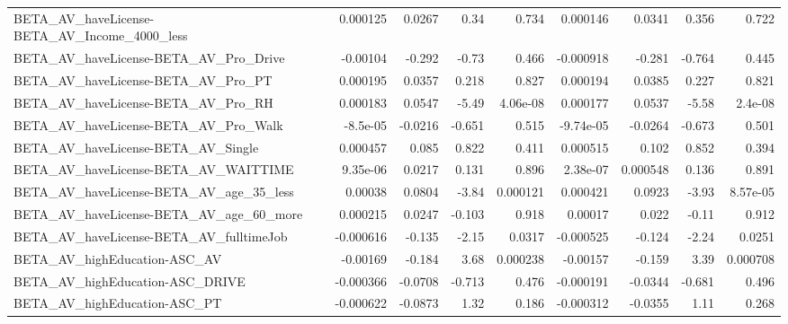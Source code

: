\begin{tabular}{lrrrrrrrr}
BETA\_AV\_haveLicense-BETA\_AV\_Income\_4000\_less       &    0.000125 &       0.0267 &      0.34 &    0.734 &   0.000146 &      0.0341 &        0.356 &         0.722 \\
BETA\_AV\_haveLicense-BETA\_AV\_Pro\_Drive              &    -0.00104 &       -0.292 &     -0.73 &    0.466 &  -0.000918 &      -0.281 &       -0.764 &         0.445 \\
BETA\_AV\_haveLicense-BETA\_AV\_Pro\_PT                 &    0.000195 &       0.0357 &     0.218 &    0.827 &   0.000194 &      0.0385 &        0.227 &         0.821 \\
BETA\_AV\_haveLicense-BETA\_AV\_Pro\_RH                 &    0.000183 &       0.0547 &     -5.49 & 4.06e-08 &   0.000177 &      0.0537 &        -5.58 &       2.4e-08 \\
BETA\_AV\_haveLicense-BETA\_AV\_Pro\_Walk               &    -8.5e-05 &      -0.0216 &    -0.651 &    0.515 &  -9.74e-05 &     -0.0264 &       -0.673 &         0.501 \\
BETA\_AV\_haveLicense-BETA\_AV\_Single                 &    0.000457 &        0.085 &     0.822 &    0.411 &   0.000515 &       0.102 &        0.852 &         0.394 \\
BETA\_AV\_haveLicense-BETA\_AV\_WAITTIME               &    9.35e-06 &       0.0217 &     0.131 &    0.896 &   2.38e-07 &    0.000548 &        0.136 &         0.891 \\
BETA\_AV\_haveLicense-BETA\_AV\_age\_35\_less            &     0.00038 &       0.0804 &     -3.84 & 0.000121 &   0.000421 &      0.0923 &        -3.93 &      8.57e-05 \\
BETA\_AV\_haveLicense-BETA\_AV\_age\_60\_more            &    0.000215 &       0.0247 &    -0.103 &    0.918 &    0.00017 &       0.022 &        -0.11 &         0.912 \\
BETA\_AV\_haveLicense-BETA\_AV\_fulltimeJob            &   -0.000616 &       -0.135 &     -2.15 &   0.0317 &  -0.000525 &      -0.124 &        -2.24 &        0.0251 \\
BETA\_AV\_highEducation-ASC\_AV                       &    -0.00169 &       -0.184 &      3.68 & 0.000238 &   -0.00157 &      -0.159 &         3.39 &      0.000708 \\
BETA\_AV\_highEducation-ASC\_DRIVE                    &   -0.000366 &      -0.0708 &    -0.713 &    0.476 &  -0.000191 &     -0.0344 &       -0.681 &         0.496 \\
BETA\_AV\_highEducation-ASC\_PT                       &   -0.000622 &      -0.0873 &      1.32 &    0.186 &  -0.000312 &     -0.0355 &         1.11 &         0.268 \\

\end{tabular}
